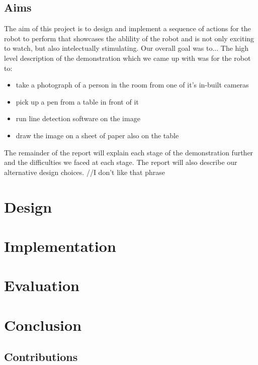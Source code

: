 \documentclass{l3proj}
\begin{document}
\section{Aims}
The aim of this project is to design and implement a sequence of actions for the robot to perform that showcases the ablility of the robot and is not only exciting to watch, but also intelectually stimulating. 
Our overall goal was to...
The high level description of the demonstration which we came up with was for the robot to:
\begin{itemize}
\item take a photograph of a person in the room from one of it's in-built cameras
\item pick up a pen from a table in front of it
\item run line detection software on the image
\item draw the image on a sheet of paper also on the table
\end{itemize}
The remainder of the report will explain each stage of the demonstration further and the difficulties we faced at each stage. The report will also describe our alternative design choices. //I don't like that phrase

\chapter{Design}
\label{design}

\chapter{Implementation}
\label{impl}

\chapter{Evaluation}


\chapter{Conclusion}

\section{Contributions}




\end{document}
